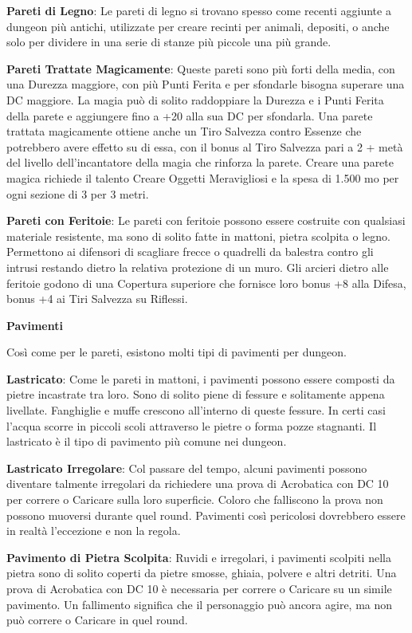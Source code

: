 \documentclass[a4paper,11pt,twoside,openany]{book}
\begin{document}
\textbf{Pareti di Legno}: Le pareti di legno si trovano spesso come recenti aggiunte a dungeon più antichi, utilizzate per creare recinti per animali, depositi, o anche solo per dividere in una serie di stanze più piccole una più grande.

\textbf{Pareti Trattate Magicamente}: Queste pareti sono più forti della media, con una Durezza maggiore, con più Punti Ferita e per sfondarle bisogna superare una DC maggiore. La magia può di solito raddoppiare la Durezza e i Punti Ferita della parete e aggiungere fino a +20 alla sua DC per sfondarla. Una parete trattata magicamente ottiene anche un Tiro Salvezza contro Essenze che potrebbero avere effetto su di essa, con il bonus al Tiro Salvezza pari a 2 + metà del livello dell'incantatore della magia che rinforza la parete. Creare una parete magica richiede il talento Creare Oggetti Meravigliosi e la spesa di 1.500 mo per ogni sezione di 3 per 3 metri.

\textbf{Pareti con Feritoie}: Le pareti con feritoie possono essere costruite con qualsiasi materiale resistente, ma sono di solito fatte in mattoni, pietra scolpita o legno. Permettono ai difensori di scagliare frecce o quadrelli da balestra contro gli intrusi restando dietro la relativa protezione di un muro. Gli arcieri dietro alle feritoie godono di una Copertura superiore che fornisce loro bonus +8 alla Difesa, bonus +4 ai Tiri Salvezza su Riflessi.

\textbf{Pavimenti}

Così come per le pareti, esistono molti tipi di pavimenti per dungeon.

\textbf{Lastricato}: Come le pareti in mattoni, i pavimenti possono essere composti da pietre incastrate tra loro. Sono di solito piene di fessure e solitamente appena livellate. Fanghiglie e muffe crescono all'interno di queste fessure. In certi casi l'acqua scorre in piccoli scoli attraverso le pietre o forma pozze stagnanti. Il lastricato è il tipo di pavimento più comune nei dungeon.

\textbf{Lastricato Irregolare}: Col passare del tempo, alcuni pavimenti possono diventare talmente irregolari da richiedere una prova di Acrobatica con DC 10 per correre o Caricare sulla loro superficie. Coloro che falliscono la prova non possono muoversi durante quel round. Pavimenti così pericolosi dovrebbero essere in realtà l'eccezione e non la regola.

\textbf{Pavimento di Pietra Scolpita}: Ruvidi e irregolari, i pavimenti scolpiti nella pietra sono di solito coperti da pietre smosse, ghiaia, polvere e altri detriti. Una prova di Acrobatica con DC 10 è necessaria per correre o Caricare su un simile pavimento. Un fallimento significa che il personaggio può ancora agire, ma non può correre o Caricare in quel round.
\end{document}
